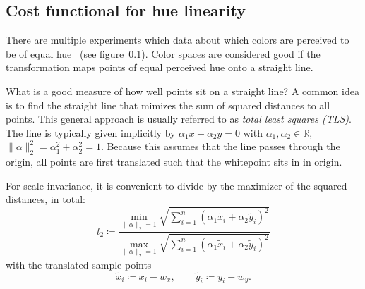 \documentclass{scrartcl}
\theoremstyle{named}
\newcommand\R{\ensuremath{\mathbb{R}}}
\begin{document}
\subsection{Cost functional for hue linearity}

There are multiple experiments which data about which colors are perceived to be of
equal hue~\cite{hung,ebner,xiao} (see figure~\ref{}). Color spaces are considered good
if the transformation maps points of equal perceived hue onto a straight line.

What is a good measure of how well points sit on a straight line?
A common idea is to find the straight line that mimizes the sum of squared distances to
all points. This general approach is usually referred to as \emph{total least squares
(TLS)}.
The line is typically
given implicitly by $\alpha_1 x + \alpha_2 y
= 0$ with $\alpha_1,\alpha_2\in\R$, $\|\alpha\|_2^2 = \alpha_1^2 + \alpha_2^2 = 1$.
Because this assumes that the line passes through the origin, all points are
first translated such that the whitepoint sits in in origin.

For scale-invariance, it is convenient to divide by the maximizer of the squared
distances, in total:
\begin{equation}\label{eq:l}
l_2 \coloneqq
  \frac{
\min_{\|\alpha\|_2=1}
  \sqrt{\sum_{i=1}^n (\alpha_1 \tilde{x}_i + \alpha_2 \tilde{y}_i)^2}
}{
\max_{\|\alpha\|_2=1}
  \sqrt{\sum_{i=1}^n (\alpha_1 \tilde{x}_i + \alpha_2 \tilde{y}_i)^2}
}
\end{equation}
with the translated sample points
\[
  \tilde{x}_i \coloneqq x_i-w_x,\qquad
  \tilde{y}_i \coloneqq y_i-w_y.
\]
\end{document}
